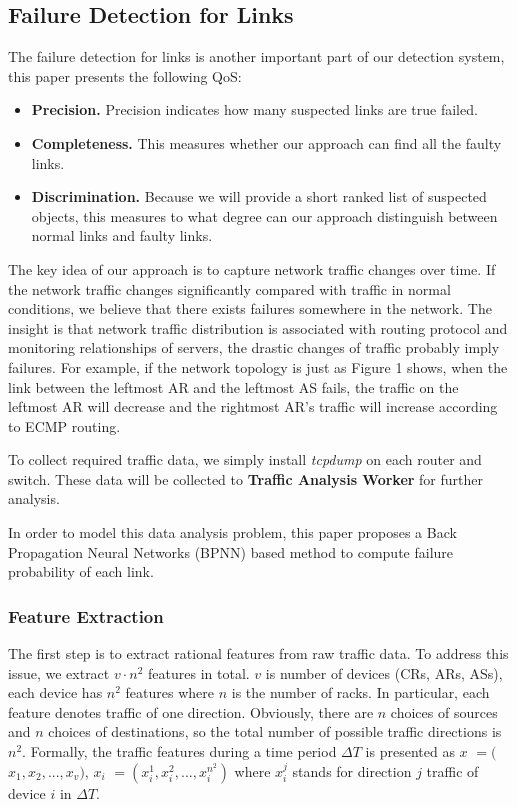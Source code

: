 \documentclass{sig-alternate-05-2015}
\begin{document}
\subsection{Failure Detection for Links}
The failure detection for links is another important part of our detection system, this paper presents the following QoS:
\begin{itemize}
  \item \textbf{Precision.} Precision indicates how many suspected links are true failed.
  \item \textbf{Completeness.} This measures whether our approach can find all the faulty links.
  \item \textbf{Discrimination.} Because we will provide a short ranked list of suspected objects, this measures to what degree can our approach distinguish between normal links and faulty links.
\end{itemize}

The key idea of our approach is to capture network traffic changes over time. If the network traffic changes significantly compared with traffic in normal conditions, we believe that there exists failures somewhere in the network. The insight is that network traffic distribution is associated with routing protocol and monitoring relationships of servers, the drastic changes of traffic probably imply failures. For example, if the network topology is just as Figure 1 shows, when the link between the leftmost AR and the leftmost AS fails, the traffic on the leftmost AR will decrease and the rightmost AR's traffic will increase according to ECMP routing.

To collect required traffic data, we simply install \textit{tcpdump} on each router and switch. These data will be collected to \textbf{Traffic Analysis Worker} for further analysis.

In order to model this data analysis problem, this paper proposes a Back Propagation Neural Networks (BPNN) based method to compute failure probability of each link.

\subsubsection*{Feature Extraction}
\quad The first step is to extract rational features from raw traffic data. To address this issue, we extract $v \cdot n^2$ features in total. $v$ is number of devices (CRs, ARs, ASs), each device has $n^2$ features where $n$ is the number of racks. In particular, each feature denotes traffic of one direction. Obviously, there are $n$ choices of sources and $n$ choices of destinations, so the total number of possible traffic directions is $n^2$.
Formally, the traffic features during a time period $\Delta T$ is presented as \boldmath $x$
\unboldmath $=($\boldmath $x_1, x_2, ..., x_v$\unboldmath $)$, \boldmath $x_i$
\unboldmath $=(x_i^1, x_i^2, ..., x_i^{n^2})$
where $x_i^j$ stands for direction $j$ traffic of device $i$ in $\Delta T$.
\end{document}
